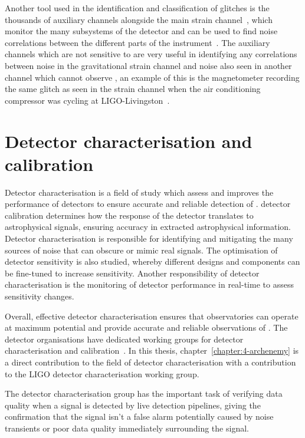 
Another tool used in the identification and classification of glitches is the thousands of auxiliary channels alongside the main strain channel~\cite{iDQ:2020}, which monitor the many subsystems of the detector and can be used to find noise correlations between the different parts of the instrument~\cite{DQ_vetoes:2017}. The auxiliary channels which are not sensitive to \gws are very useful in identifying any correlations between noise in the gravitational strain channel and noise also seen in another channel which cannot observe \gws, an example of this is the magnetometer recording the same glitch as seen in the \gwadj strain channel when the air conditioning compressor was cycling at LIGO-Livingston~\cite{Nuttall:2018}.

\section{\label{3:sec:detchar_calib}Detector characterisation and calibration}

Detector characterisation is a field of study which assess and improves the performance of \gwadj detectors to ensure accurate and reliable detection of \gws. \Gwadj detector calibration determines how the response of the detector translates to astrophysical signals, ensuring accuracy in extracted astrophysical information. Detector characterisation is responsible for identifying and mitigating the many sources of noise that can obscure or mimic real signals. The optimisation of detector sensitivity is also studied, whereby different designs and components can be fine-tuned to increase sensitivity. Another responsibility of detector characterisation is the monitoring of detector performance in real-time to assess sensitivity changes.

Overall, effective detector characterisation ensures that \gwadj observatories can operate at maximum potential and provide accurate and reliable observations of \gws. The \gwadj detector organisations have dedicated working groups for detector characterisation and calibration~\cite{O2O3_DetChar:2021, VirgoDetChar:2023}. In this thesis, chapter~\ref{chapter:4-archenemy} is a direct contribution to the field of detector characterisation with a contribution to the LIGO detector characterisation working group.

The detector characterisation group has the important task of verifying data quality when a \gwadj signal is detected by live detection pipelines, giving the confirmation that the \gwadj signal isn't a false alarm potentially caused by noise transients or poor data quality immediately surrounding the \gwadj signal.

